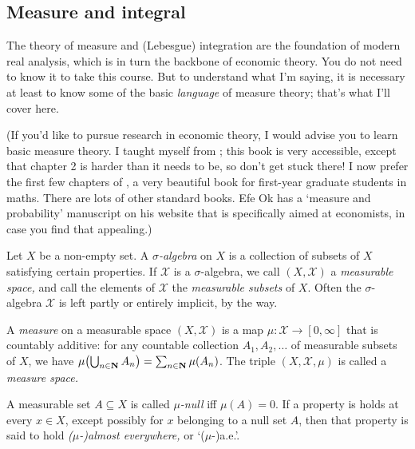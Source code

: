 \documentclass[11pt,letterpaper,reqno,oneside]{book}
\begin{document}
\begin{appendices}





\chapter{Measure and integral}
\label{ch:meas}

The theory of measure and (Lebesgue) integration are the foundation of modern real analysis, which is in turn the backbone of economic theory.
You do not need to know it to take this course.
But to understand what I'm saying,
it is necessary at least to know some of the basic \emph{language} of measure theory; that's what I'll cover here.

(If you'd like to pursue research in economic theory, I would advise you to learn basic measure theory.
I taught myself from \textcite{Rosenthal2006}; this book is very accessible, except that chapter 2 is harder than it needs to be, so don't get stuck there! I now prefer the first few chapters of \textcite{Folland1999}, a very beautiful book for first-year graduate students in maths. There are lots of other standard books. Efe Ok has a `measure and probability' manuscript on his website that is specifically aimed at economists, in case you find that appealing.)


Let $X$ be a non-empty set.
A \emph{$\sigma$-algebra} on $X$ is a collection of subsets of $X$ satisfying certain properties.
If $\mathcal{X}$ is a $\sigma$-algebra, we call $(X,\mathcal{X})$ a \emph{measurable space,} and call the elements of $\mathcal{X}$ the \emph{measurable subsets} of $X$.
Often the $\sigma$-algebra $\mathcal{X}$ is left partly or entirely implicit, by the way.

A \emph{measure} on a measurable space $(X,\mathcal{X})$ is a map $\mu : \mathcal{X} \to [0,\infty]$ that is countably additive:
for any countable collection $A_1,A_2,\dots$ of measurable subsets of $X$,
we have $\mu\left( \Union_{n \in \N} A_n \right) = \sum_{n \in \N} \mu(A_n)$.
The triple $(X,\mathcal{X},\mu)$ is called a \emph{measure space.}

A measurable set $A \subseteq X$ is called \emph{$\mu$-null} iff $\mu(A)=0$. If a property is holds at every $x \in X$, except possibly for $x$ belonging to a null set $A$, then that property is said to hold \emph{($\mu$-)almost everywhere,} or `($\mu$-)a.e.'.


\end{appendices}
\end{document}
